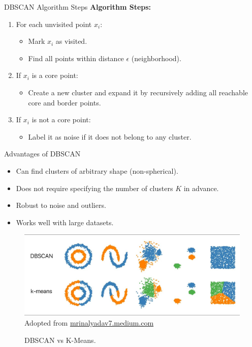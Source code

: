 \documentclass[serif, aspectratio=169]{beamer}
\begin{document}
\begin{frame}{DBSCAN Algorithm Steps}
    \textbf{Algorithm Steps:}
    \begin{enumerate}
        \item For each unvisited point $ x_i $:
        \begin{itemize}
            \item Mark $ x_i $ as visited.
            \item Find all points within distance $ \epsilon $ (neighborhood).
        \end{itemize}
        
        \item If $ x_i $ is a core point:
        \begin{itemize}
            \item Create a new cluster and expand it by recursively adding all reachable core and border points.
        \end{itemize}
        
        \item If $x_i$ is not a core point:
        \begin{itemize}
            \item Label it as noise if it does not belong to any cluster.
        \end{itemize}
    \end{enumerate}
\end{frame}

\begin{frame}{Advantages of DBSCAN}
    \begin{itemize}
        \item Can find clusters of arbitrary shape (non-spherical).
        \item Does not require specifying the number of clusters \( K \) in advance.
        \item Robust to noise and outliers.
        \item Works well with large datasets.
    \end{itemize}
    \begin{figure}
        \centering
        \includegraphics[scale = 0.45]{pic/figs/dbscan.jpg}
        {\scriptsize Adopted from \href{https://mrinalyadav7.medium.com/dbscan-algorithm-c894701306d5}{mrinalyadav7.medium.com}}
        \caption{DBSCAN vs K-Means.}
        \label{fig:dbscan-kmeans}
    \end{figure}
\end{frame}
\end{document}

